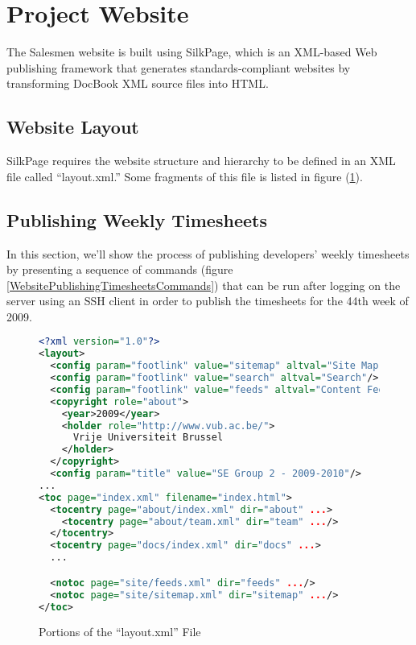 \section{Project Website}\label{Website}

The Salesmen website is built using SilkPage, which is an XML-based 
Web publishing framework that generates standards-compliant websites by
transforming DocBook XML source files into HTML.

\subsection{Website Layout}\label{WebsiteLayout}
SilkPage requires the website structure and hierarchy to be defined in an
XML file called ``layout.xml.'' Some fragments of this file is listed in
figure (\ref{WebsiteLayoutFile}).

\subsection{Publishing Weekly Timesheets}\label{WebsitePublishingTimesheets}

In this section, we'll show the process of publishing developers' weekly
timesheets by presenting a sequence of commands (figure \ref{WebsitePublishingTimesheetsCommands}) that can be run after 
logging on the server using an SSH client in order to publish the timesheets
for the 44th week of 2009.

\begin{figure}[th]
\caption{Portions of the ``layout.xml'' File}
\label{WebsiteLayoutFile}
\begin{lstlisting}[language=XML]
<?xml version="1.0"?>
<layout>
  <config param="footlink" value="sitemap" altval="Site Map"/>
  <config param="footlink" value="search" altval="Search"/>
  <config param="footlink" value="feeds" altval="Content Feeds"/>
  <copyright role="about">
    <year>2009</year>
    <holder role="http://www.vub.ac.be/">
      Vrije Universiteit Brussel
    </holder>
  </copyright>
  <config param="title" value="SE Group 2 - 2009-2010"/>
...
<toc page="index.xml" filename="index.html">
  <tocentry page="about/index.xml" dir="about" ...>
    <tocentry page="about/team.xml" dir="team" .../>
  </tocentry>
  <tocentry page="docs/index.xml" dir="docs" ...>
  ...

  <notoc page="site/feeds.xml" dir="feeds" .../>
  <notoc page="site/sitemap.xml" dir="sitemap" .../>
</toc>
\end{lstlisting}
\end{figure}


